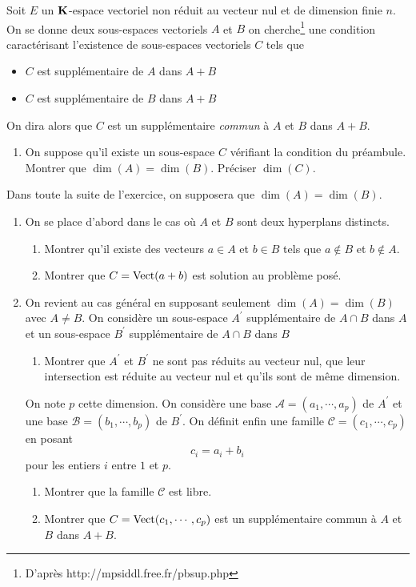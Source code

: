 Soit $E$ un $\mathbf{K}$-espace vectoriel non réduit au vecteur nul et de dimension finie $n$. On se donne deux sous-espaces vectoriels $A$ et $B$ on cherche\footnote{D'après http://mpsiddl.free.fr/pbsup.php} une condition caractérisant l'existence de sous-espaces vectoriels $C$ tels que \begin{itemize}
 \item $C$ est supplémentaire de $A$ dans $A+B$
 \item $C$ est supplémentaire de $B$ dans $A+B$
\end{itemize}
On dira alors que $C$ est un supplémentaire \emph{commun} à $A$ et $B$ dans $A+B$.
\begin{enumerate}
 \item On suppose qu'il existe un sous-espace $C$ vérifiant la condition du préambule. Montrer que $\dim (A)= \dim (B)$. Préciser $\dim (C)$.
\end{enumerate}

Dans toute la suite de l'exercice, on supposera que $\dim (A)= \dim (B)$.

\begin{enumerate}
 \item On se place d'abord dans le cas où $A$ et $B$ sont deux hyperplans distincts.
   \begin{enumerate}
      \item Montrer qu'il existe des vecteurs $a\in A$ et $b \in B$ tels que $a\not \in B$ et $b \not \in A$.
      \item Montrer que $C=\operatorname{Vect} (a+b)$ est solution au problème posé.
   \end{enumerate}
  \item On revient au cas général en supposant seulement $\dim (A)= \dim (B)$ avec $A\neq B$. On considère un sous-espace $A^\prime$ supplémentaire de $A\cap B$ dans $A$ et un sous-espace $B^\prime$ supplémentaire de $A\cap B$ dans $B$
\begin{enumerate}
 \item Montrer que $A^\prime$ et $B^\prime$ ne sont pas réduits au vecteur nul, que leur intersection est réduite au vecteur nul et qu'ils sont de même dimension.
\end{enumerate}

On note $p$ cette dimension. On considère une base $\mathcal A =(a_1,\cdots ,a_p)$ de $A^\prime$ et une base $\mathcal B =(b_1,\cdots ,b_p)$ de $B^\prime$. On définit enfin une famille $\mathcal C =(c_1,\cdots ,c_p)$ en posant 
\begin{displaymath}
 c_i = a_i + b_i
\end{displaymath}
pour les entiers $i$ entre $1$ et $p$.

\begin{enumerate}  
 \item Montrer que la famille $\mathcal C$ est libre.
 \item Montrer que $C=\operatorname{Vect} (c_1,\cdots , c_p)$ est un supplémentaire commun à $A$ et $B$ dans $A+B$.
\end{enumerate}
\end{enumerate}
